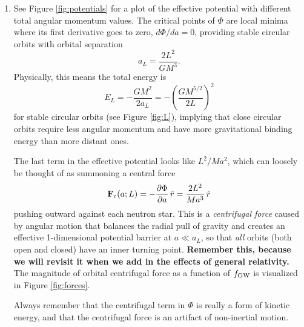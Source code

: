 \documentclass[11pt]{article}
\begin{document}
\begin{enumerate}
\item See Figure \ref{fig:potentials} for a plot of the effective potential with different total angular momentum values. The critical points of $\Phi$ are local minima where its first derivative goes to zero, $d\Phi/da = 0$, providing stable circular orbits with orbital separation
\begin{equation}\label{eq:aL}
a_L = \frac{2L^2}{GM^3}.
\end{equation}
Physically, this means the total energy is
\begin{equation}\label{eq:energy}
E_L = -\frac{GM^2}{2a_L} = - \left( \frac{GM^{5/2}}{2L} \right)^2
\end{equation} for stable circular orbits (see Figure \ref{fig:L}), implying that close circular orbits require less angular momentum and have more gravitational binding energy than more distant ones.

\hspace{15pt} The last term in the effective potential looks like $L^2/Ma^2$, which can loosely be thought of as summoning a central force
\begin{equation}
\mathbf{F}_{\rm c}(a; L) = -\frac{\partial\Phi}{\partial a} \, \hat{r} = \frac{2L^2}{Ma^3} \, \hat{r}
\end{equation}
pushing outward against each neutron star. This is a \textit{centrifugal force} caused by angular motion that balances the radial pull of gravity and creates an effective 1-dimensional potential barrier at $a \ll a_L$, so that \emph{all} orbits (both open and closed) have an inner turning point. \textbf{Remember this, because we will revisit it when we add in the effects of general relativity.} The magnitude of orbital centrifugal force as a function of $f_{\rm GW}$ is visualized in Figure \ref{fig:forces}.

\hspace{15pt} Always remember that the centrifugal term in $\Phi$ is really a form of kinetic energy, and that the centrifugal force is an artifact of non-inertial motion.


\end{enumerate}
\end{document}
